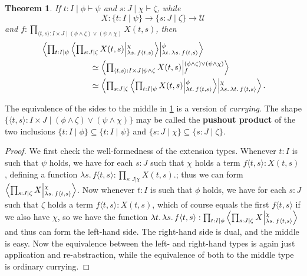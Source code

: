 \documentclass[12pt]{amsart}
\theoremstyle{plain}
\newtheorem{thm}{Theorem}[section]
\theoremstyle{definition}
\theoremstyle{remark}
\numberwithin{equation}{section}
\newcommand{\tprod}{\textstyle\prod}
\newcommand{\exten}[4]{\left\langle\mathchoice{\textstyle\prod_{#1}}{\textstyle\prod_{#1}}{\scriptstyle\prod_{#1}}{\scriptscriptstyle\prod_{#1}} #2 \middle|^{#3}_{#4}\right\rangle}
\newcommand{\types}{\vdash}
\newcommand{\univtype}{\mathcal{U}}
\newcommand{\sh}[2]{\{#1\mid #2\}}
\newcommand{\pair}[1]{\langle #1\rangle}
\newcommand{\lam}[1]{\lambda #1.\,}
\begin{document}
\begin{thm}\label{thm:exten-curry}
  If $t:I \mid \phi\types\psi$ and $s:J \mid \chi\types\zeta$, while
  \[X:\sh{t:I}{\psi} \to \sh{s:J}{\zeta} \to \univtype\]
  and $f:\tprod_{\pair{t,s}:I\times J\mid (\phi\land\zeta)\lor(\psi\land\chi)} X(t,s)$, then
  \begin{align*} &\exten{t:I|\psi}{\exten{s:J|\zeta}{X(t,s)}{\chi}{\lam{s}f{\pair{t,s}}}}{\phi}{\lam{t}\lam{s}f{\pair{t,s}}}
  \\&\qquad\qquad\qquad\simeq \exten{\pair{t,s}:I\times J|\psi\land\zeta}{X(t,s)}{(\phi\land\zeta)\lor(\psi\land\chi)}{f}
\\&\qquad\qquad\qquad\simeq \exten{s:J|\zeta}{\exten{t:I|\psi}{X(t,s)}{\phi}{\lam{t}f{\pair{t,s}}}}{\chi}{\lam{s}\lam{t}f{\pair{t,s}}}. \end{align*}
\end{thm}
The equivalence of the sides to the middle in \cref{thm:exten-curry} is a version of \emph{currying}.
The shape $\sh{\pair{t,s}:I\times J}{(\phi\land\zeta)\lor(\psi\land\chi)}$ may be called the \textbf{pushout product} of the two inclusions $\sh{t:I}{\phi} \subseteq \sh{t:I}{\psi}$ and $\sh{s:J}{\chi}\subseteq \sh{s:J}{\zeta}$.
\begin{proof}
  We first check the well-formedness of the extension types.
  {Whenever $t : I$ is such that $\psi$ holds, we have for each $s : J$ such that $\chi$ holds a term $f\pair{t,s}:X(t,s)$, defining a function $\lam{s}f\pair{t,s} : \tprod_{s:J|\chi}X(t,s)$.; thus we can form
 $\exten{s:J|\zeta}{X}{\chi}{\lam{s} f\pair{t,s}}$. Now whenever $t : I$ is such that $\phi$ holds, we have for each $s : J$ such that $\zeta$ holds a term $f\pair{t,s}:X(t,s)$, which of course equals the first $f\pair{t,s}$ if we also have $\chi$, so we have the function $\lam{t}\lam{s}f\pair{t,s}:\tprod_{t:I|\phi}\exten{s:J|\zeta}{X}{\chi}{\lam{s} f\pair{t,s}}$ and thus can form the left-hand side.}
  The right-hand side is dual, and the middle is easy.
  Now the equivalence between the left- and right-hand types is again just application and re-abstraction, while the equivalence of both to the middle type is ordinary currying.
\end{proof}
\end{document}

